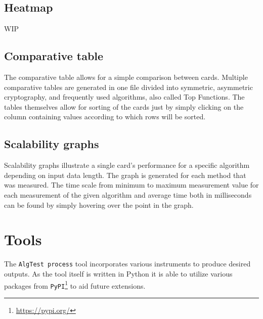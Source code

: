 \subsection{Heatmap}
WIP

\subsection{Comparative table}
The comparative table allows for a simple comparison between cards. Multiple comparative tables are generated in one file divided into symmetric, asymmetric cryptography, and frequently used algorithms, also called Top Functions. The tables themselves allow for sorting of the cards just by simply clicking on the column containing values according to which rows will be sorted.


\subsection{Scalability graphs}
Scalability graphs illustrate a single card's performance for a specific algorithm depending on input data length. The graph is generated for each method that was measured. The time scale from minimum to maximum measurement value for each measurement of the given algorithm and average time both in milliseconds can be found by simply hovering over the point in the graph.





\section{Tools}\label{sec:tools}
The \texttt{AlgTest process} tool incorporates various instruments to produce desired outputs. As the tool itself is written in Python it is able to utilize various packages from \texttt{PyPI}\footnote{\url{https://pypi.org/}} to aid future extensions.

